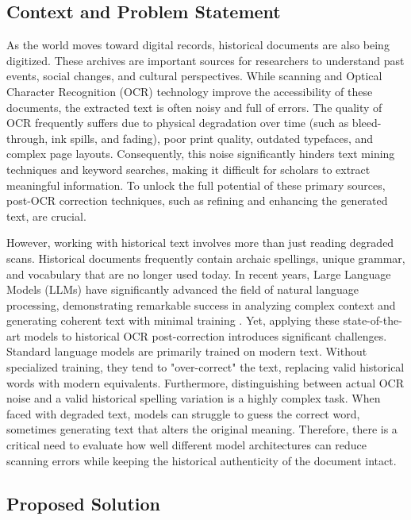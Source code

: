 \documentclass[11pt]{extarticle}
\begin{document}
\subsection{Context and Problem Statement}
As the world moves toward digital records, historical documents are also being digitized. These archives are important sources for researchers to understand past events, social changes, and cultural perspectives. While scanning and Optical Character Recognition (OCR) technology improve the accessibility of these documents, the extracted text is often noisy and full of errors. The quality of OCR frequently suffers due to physical degradation over time (such as bleed-through, ink spills, and fading), poor print quality, outdated typefaces, and complex page layouts. Consequently, this noise significantly hinders text mining techniques and keyword searches, making it difficult for scholars to extract meaningful information. To unlock the full potential of these primary sources, post-OCR correction techniques, such as refining and enhancing the generated text, are crucial. 

However, working with historical text involves more than just reading degraded scans. Historical documents frequently contain archaic spellings, unique grammar, and vocabulary that are no longer used today. In recent years, Large Language Models (LLMs) have significantly advanced the field of natural language processing, demonstrating remarkable success in analyzing complex context and generating coherent text with minimal training \cite{liang2023holisticevaluationlanguagemodels, zhao2026surveylargelanguagemodels}. Yet, applying these state-of-the-art models to historical OCR post-correction introduces significant challenges. Standard language models are primarily trained on modern text. Without specialized training, they tend to "over-correct" the text, replacing valid historical words with modern equivalents. Furthermore, distinguishing between actual OCR noise and a valid historical spelling variation is a highly complex task. When faced with degraded text, models can struggle to guess the correct word, sometimes generating text that alters the original meaning. Therefore, there is a critical need to evaluate how well different model architectures can reduce scanning errors while keeping the historical authenticity of the document intact.

\subsection{Proposed Solution}
\end{document}
